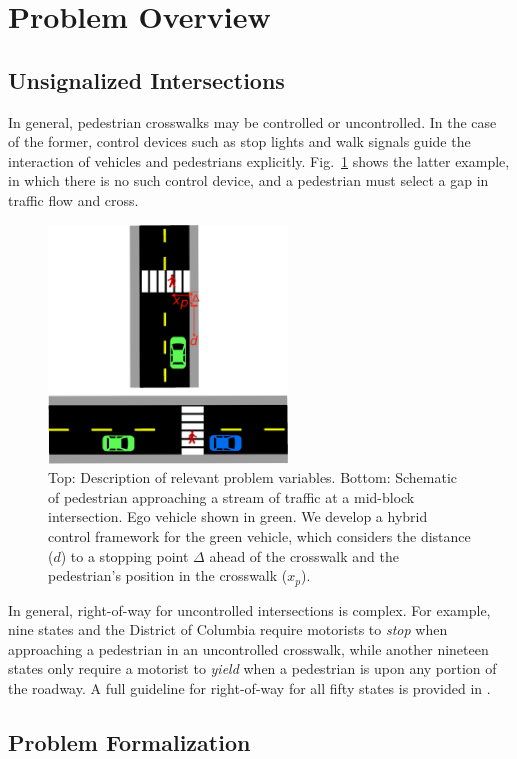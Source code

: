 \documentclass[letterpaper, 10 pt, conference]{ieeeconf} %
\begin{document}
\section{Problem Overview}

\subsection{Unsignalized Intersections}

In general, pedestrian crosswalks may be controlled or uncontrolled. In the case of the former, control devices such as stop lights and walk signals guide the interaction of vehicles and pedestrians explicitly. Fig.~\ref{fig:schematic} shows the latter example, in which there is no such control device, and a pedestrian must select a gap in traffic flow and cross.  

\begin{figure}
\centering
\includegraphics[width=2.5in]{example2.eps}
\caption{Top: Description of relevant problem variables. Bottom: Schematic of pedestrian approaching a stream of traffic at a mid-block intersection. Ego vehicle shown in green. We develop a hybrid control framework for the green vehicle, which considers the distance ($d$) to a stopping point $\Delta$ ahead of the crosswalk and the pedestrian's position in the crosswalk ($x_p$).}
\label{fig:schematic}
\end{figure}

In general, right-of-way for uncontrolled intersections is complex. For example, nine states and the District of Columbia require motorists to \textit{stop} when approaching a pedestrian in an uncontrolled crosswalk, while another nineteen states only require a motorist to \textit{yield} when a pedestrian is upon any portion of the roadway. A full guideline for right-of-way for all fifty states is provided in \cite{Legislatures2018}.

\subsection{Problem Formalization}
\label{sec:probform}
\end{document}
